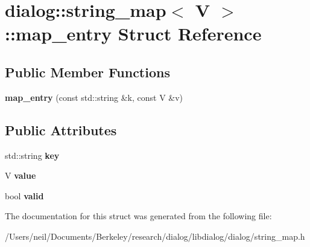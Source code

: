 \hypertarget{structdialog_1_1string__map_1_1map__entry}{}\section{dialog\+:\+:string\+\_\+map$<$ V $>$\+:\+:map\+\_\+entry Struct Reference}
\label{structdialog_1_1string__map_1_1map__entry}
\subsection*{Public Member Functions}
\begin{DoxyCompactItemize}
\item 
\mbox{\label{structdialog_1_1string__map_1_1map__entry_ad4da6a1dace8b9606589ec4eaa6793e0}} 
{\bfseries map\+\_\+entry} (const std\+::string \&k, const V \&v)
\end{DoxyCompactItemize}
\subsection*{Public Attributes}
\begin{DoxyCompactItemize}
\item 
\mbox{\label{structdialog_1_1string__map_1_1map__entry_a4f0528ab94efa27c499f3fdbf3721371}} 
std\+::string {\bfseries key}
\item 
\mbox{\label{structdialog_1_1string__map_1_1map__entry_ac6f877850d9c7c41b4f2e5e631dd4245}} 
V {\bfseries value}
\item 
\mbox{\label{structdialog_1_1string__map_1_1map__entry_a8efec7d687e3d9194f27f4a8300cb775}} 
bool {\bfseries valid}
\end{DoxyCompactItemize}


The documentation for this struct was generated from the following file\+:\begin{DoxyCompactItemize}
\item 
/\+Users/neil/\+Documents/\+Berkeley/research/dialog/libdialog/dialog/string\+\_\+map.\+h\end{DoxyCompactItemize}
